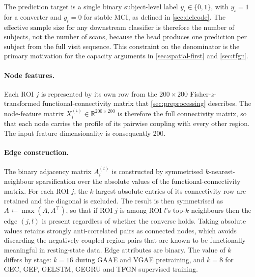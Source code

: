The prediction target is a single
binary subject-level label $y_i \in \{0, 1\}$, with $y_i = 1$ for a converter and
$y_i = 0$ for stable \ac{MCI}, as defined in \autoref{sec:delcode}. The effective sample
size for any downstream classifier is therefore the number of subjects, not the number of
scans, because the head produces one prediction per subject from the full visit sequence.
This constraint on the denominator is the primary motivation for the capacity arguments in
\autoref{sec:spatial-first} and \autoref{sec:tfgn}.

\paragraph{Node features.}
Each \ac{ROI} $j$ is represented by its own row from the $200 \times 200$
Fisher-$z$-transformed functional-connectivity matrix that \autoref{sec:preprocessing}
describes. The node-feature matrix $X_i^{(t)} \in \mathbb{R}^{200 \times 200}$ is
therefore the full connectivity matrix, so that each node carries the profile of its
pairwise coupling with every other region. The input feature dimensionality is consequently 200.

\paragraph{Edge construction.}
The binary adjacency matrix $A_i^{(t)}$ is constructed by symmetrised $k$-nearest-neighbour
sparsification over the absolute values of the functional-connectivity matrix. For each
\ac{ROI} $j$, the $k$ largest absolute entries of its connectivity row are retained and
the diagonal is excluded. The result is then symmetrised as $A \leftarrow \max(A, A^\top)$,
so that if \ac{ROI} $j$ is among \ac{ROI} $l$'s top-$k$ neighbours then the edge $(j, l)$
is present regardless of whether the converse holds. Taking absolute values retains strongly
anti-correlated pairs as connected nodes, which avoids discarding the negatively coupled
region pairs that are known to be functionally meaningful in resting-state data. Edge
attributes are binary. The value of $k$ differs by stage: $k = 16$ during \ac{GAAE} and
\ac{VGAE} pretraining, and $k = 8$ for \ac{GEC}, \ac{GEP}, \ac{GELSTM}, \ac{GEGRU} and
\ac{TFGN} supervised training.

